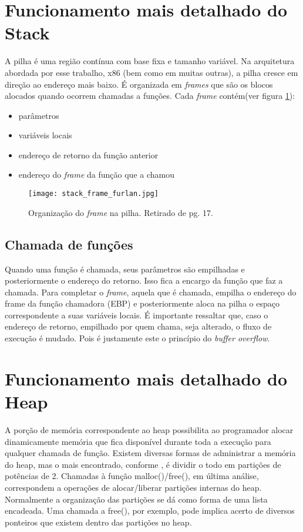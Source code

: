 	\section{Funcionamento mais detalhado do Stack}
	A pilha é uma região contínua com base fixa e tamanho variável.
	Na arquitetura abordada por esse trabalho, x86 (bem como em muitas outras), a pilha cresce
	em direção ao endereço mais baixo. É organizada em \textsl{frames} que são os blocos
	alocados quando ocorrem chamadas a funções. Cada \textsl{frame} contém(ver figura \ref{fig:stack_frame}):
	\begin{itemize}
		\item parâmetros
		\item variáveis locais
		\item endereço de retorno da função anterior
		\item endereço do \textsl{frame} da função que a chamou
	\end{itemize}

	\begin{figure}
		\begin{center}
		\texttt{[image: stack\_frame\_furlan.jpg]}
		\caption{Organização do \textsl{frame} na pilha. Retirado de \cite{Furlan2005} pg. 17.}
		\label{fig:stack_frame}
		\end{center}
	\end{figure}

	\subsection{Chamada de funções}
	Quando uma função é chamada, seus parâmetros são empilhadas e posteriormente o endereço
	do retorno. Isso fica a encargo da função que faz a chamada.
	Para completar o \textsl{frame}, aquela que é chamada, empilha o endereço do frame da função chamadora
	(EBP) e posteriormente aloca na pilha o espaço correspondente a suas variáveis locais.
	É importante ressaltar que, caso o endereço de retorno, empilhado por quem chama, seja alterado,
	o fluxo de execução é mudado. Pois é justamente este o princípio do \textsl{buffer overflow}.

	\section{Funcionamento mais detalhado do Heap}
	A porção de memória correspondente ao heap possibilita ao programador alocar dinamicamente memória
	que fica disponível durante toda a execução para qualquer chamada de função.
	Existem diversas formas de administrar a memória do heap, mas o mais encontrado, conforme
	\cite{Love2007}, é dividir o todo em partições de potências de 2. Chamadas à função malloc()/free(),
	em última análise, correspondem a operações de alocar/liberar partições internas do heap.
	Normalmente a organização das partições se dá como forma de uma lista encadeada.
	Uma chamada a free(), por exemplo, pode implica acerto de diversos ponteiros que existem
	dentro das partições no heap.
	 

